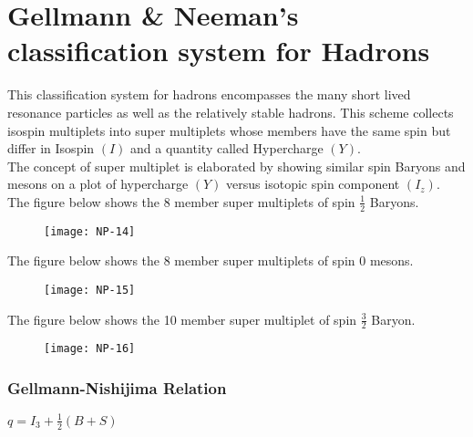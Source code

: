 \section{Gellmann \& Neeman's classification system for Hadrons}
This classification system for hadrons encompasses the many short lived resonance particles as well as the relatively stable hadrons. This scheme collects isospin multiplets into super multiplets whose members have the same spin but differ in Isospin $(I)$ and a quantity called Hypercharge $(Y)$.\\

The concept of super multiplet is elaborated by showing similar spin Baryons and mesons on a plot of hypercharge $(Y)$ versus isotopic spin component $\left(I_z\right)$.\\
The figure below shows the 8 member super multiplets of spin $\frac{1}{2}$ Baryons.
\begin{figure}[H]
	\centering
	\texttt{[image: NP-14]}
\end{figure}
The figure below shows the 8 member super multiplets of spin 0 mesons.
\begin{figure}[H]
	\centering
	\texttt{[image: NP-15]}
\end{figure}
The figure below shows the 10 member super multiplet of spin $\frac{3}{2}$ Baryon.
\begin{figure}[H]
	\centering
	\texttt{[image: NP-16]}
	\caption{}
	\label{}
\end{figure}
\subsubsection{Gellmann-Nishijima Relation}
$q=I_3+\frac{1}{2}(B+S)$
